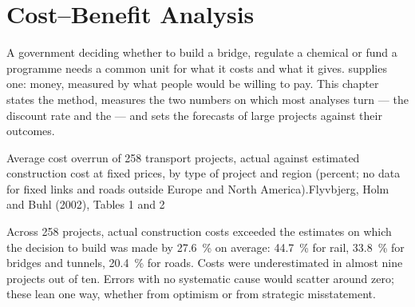 \chapter{Cost--Benefit Analysis}\label{ch:b3:cost-benefit-analysis}

A government deciding whether to build a bridge, regulate a chemical or fund a
programme needs a common unit for what it costs and what it gives.  supplies one: money, measured by what people would be willing to pay.
This chapter states the method, measures the two numbers on which most analyses
turn --- the discount rate and the  --- and sets the
forecasts of large projects against their outcomes.

\begin{openingchart}{Average cost overrun of 258 transport projects, actual against
estimated construction cost at fixed prices, by type of project and region
(percent; no data for fixed links and roads outside Europe and North
America).}{Flyvbjerg, Holm and Buhl (2002), Tables 1 and 2}
\end{openingchart}

Across 258 projects, actual construction costs exceeded the estimates on which the
decision to build was made by 27.6~\% on average: 44.7~\% for rail, 33.8~\% for bridges and
tunnels, 20.4~\% for roads. Costs were underestimated in almost nine projects out of
ten. %
Errors with no systematic cause would scatter around zero; these lean one way,
whether from optimism or from strategic misstatement.

